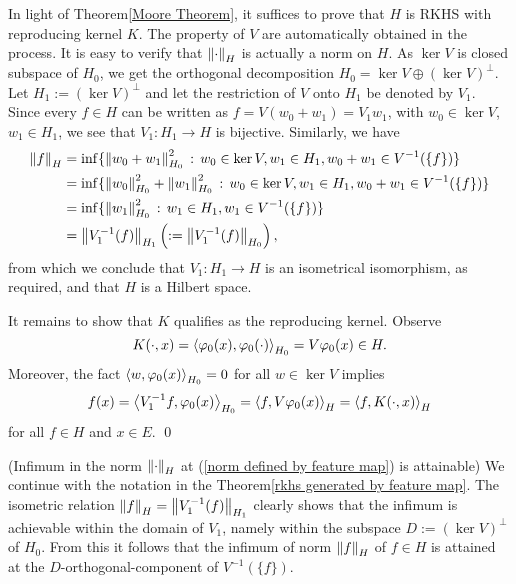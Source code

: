 \documentclass[a4paper,12pt]{article}
\begin{document}
\begin{prf}
	In light of Theorem\ref{Moore Theorem}, it suffices to prove that \( H \) is RKHS with reproducing kernel \( K \). The property of \( V \) are automatically obtained in the process. It is easy to verify that \( \left\| \cdot  \right\|_H \) is actually a norm on \( H \). As \( \ker V \) is closed subspace of \( H_0 \), we get the orthogonal decomposition \( H_0 = \ker V \oplus \left( \ker V \right)^{\perp} \). Let \( H_1 := \left( \ker V \right)^{\perp} \) and let the restriction of \( V \) onto \( H_1 \) be denoted by \( V_1 \). Since every \( f \in H \) can be written as \( f = V(w_0+w_1) = V_1 w_1 \), with \( w_0 \in \ker V \), \( w_1 \in H_1 \),  we see that \( V_1 :H_1 \to H \) is bijective. Similarly, we have
	\begin{equation*}
		\begin{aligned}
			\left\| f \right\|_H
			 & = \inf \{ \left\| w_0+w_1 \right\|_{H_0} ^2 \,:\, w_0 \in \ker V, w_1 \in H_1, w_0 + w_1 \in V^{-1}(\{f\})\}                 \\
			 & = \inf \{ \left\| w_0 \right\|_{H_0}^2 + \left\| w_1 \right\|_{H_0}^2 \,:\, w_0 \in \ker V, w_1 \in H_1, w_0 + w_1 \in V^{-1}(\{f\})\} \\
			 & = \inf \{ \left\| w_1 \right\|_{H_0}^2 \,:\, w_1 \in H_1, w_1 \in V^{-1}(\{f\})\}                                            \\
			 & = \left\| V_1^{-1}(f) \right\|_{H_1} \left( := \left\| V_1^{-1}(f) \right\|_{H_0} \right),
		\end{aligned}
	\end{equation*}
	from which we conclude that \( V_1 :H_1 \to H \) is an isometrical isomorphism, as required, and that \( H \) is a Hilbert space.
	
	It remains to show that \( K \) qualifies as the reproducing kernel. Observe
	\begin{equation*}
		K(\cdot ,x) = \left<\varphi_0(x), \varphi_0(\cdot ) \right>_{H_0} = V \varphi_0(x)\in H.
	\end{equation*}
	Moreover, the fact \( \left<w, \varphi_0(x) \right>_{H_0} = 0 \) for all \( w \in \ker V \) implies
	\begin{equation*}
		f(x) = \left<V_1^{-1}f, \varphi_0(x) \right>_{H_0} = \left<f, V \varphi_0(x) \right>_H = \left<f, K(\cdot ,x) \right>_H
	\end{equation*}
	for all \( f \in H \) and \( x \in E \).
	\qed\end{prf}
\begin{rem} (Infimum in the norm \( \left\| \cdot  \right\|_H \) at (\ref{norm defined by feature map}) is attainable)\label{remark attainablity of norm induced by feature map}
	We continue with the notation in the Theorem\ref{rkhs generated by feature map}. The isometric relation \( \left\| f \right\|_H = \left\| V_1^{-1}(f) \right\|_{H_1}\) clearly shows that the infimum is achievable within the domain of \( V_1 \), namely within the subspace \( D:=(\ker V)^{\perp } \) of \( H_0 \). From this it follows that the infimum of norm \( \left\| f \right\|_H \) of \( f \in H \) is attained at the \( D \)-orthogonal-component of \( V^{-1}(\{f\}) \).
	\fin\end{rem}
\end{document}
